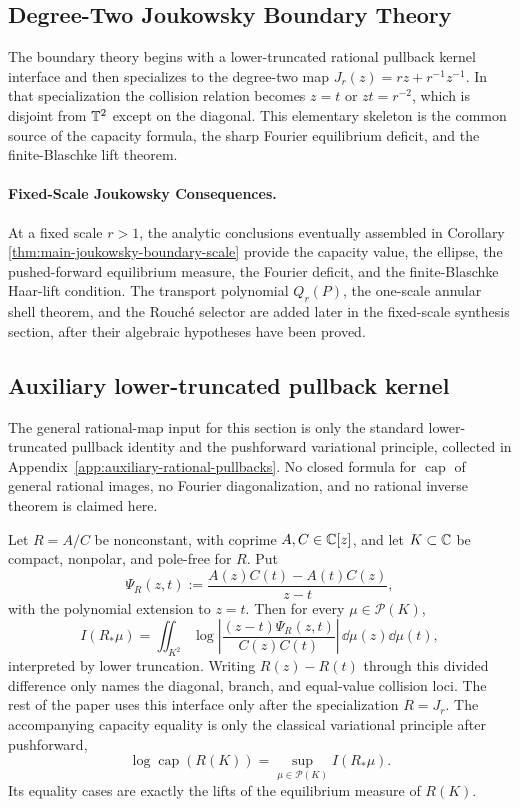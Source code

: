 \subsection{Degree-Two Joukowsky Boundary Theory}\label{subsec:main-joukowsky-boundary-scale}

The boundary theory begins with a lower-truncated rational pullback
kernel interface and then specializes to the degree-two map
\(J_r(z)=rz+r^{-1}z^{-1}\).  In that specialization the collision
relation becomes \(z=t\) or \(zt=r^{-2}\), which is disjoint from
\(\mathbb{T}^2\) except on the diagonal.  This elementary skeleton is the
common source of the capacity formula, the sharp Fourier equilibrium
deficit, and the finite-Blaschke lift theorem.

\paragraph{Fixed-Scale Joukowsky Consequences.}\label{par:fixed-scale-joukowsky-package-scope}
At a fixed scale \(r>1\), the analytic conclusions eventually assembled
in Corollary \ref{thm:main-joukowsky-boundary-scale} provide the capacity
value, the ellipse, the pushed-forward equilibrium measure, the Fourier
deficit, and the finite-Blaschke Haar-lift condition.  The transport
polynomial \(Q_r(P)\), the one-scale annular shell theorem, and the
Rouch\'e selector are added later in the fixed-scale synthesis section,
after their algebraic hypotheses have been proved.

\subsection{Auxiliary lower-truncated pullback kernel}\label{subsec:degree-two-joukowsky-specialization}

The general rational-map input for this section is only the standard
lower-truncated pullback identity and the pushforward variational
principle, collected in Appendix~\ref{app:auxiliary-rational-pullbacks}.
No closed formula for \(\operatorname{cap}\) of general rational images,
no Fourier diagonalization, and no rational inverse theorem is claimed
here.
\begin{proposition}\label{prop:main-rational-pullback-interface}
Let \(R=A/C\) be nonconstant, with coprime \(A,C\in\mathbb{C}[z]\), and let
\(K\subset\mathbb{C}\) be compact, nonpolar, and pole-free for \(R\).  Put
\[
\Psi_R(z,t):=\frac{A(z)C(t)-A(t)C(z)}{z-t},
\]
with the polynomial extension to \(z=t\).  Then for every
\(\mu\in\mathcal P(K)\),
\[
I(R_\ast\mu)=
\iint_{K^2}\log\left|
\frac{(z-t)\Psi_R(z,t)}{C(z)C(t)}
\right|\,\dd\mu(z)\dd\mu(t),
\]
interpreted by lower truncation.  Writing \(R(z)-R(t)\) through this
divided difference only names the diagonal, branch, and equal-value
collision loci.  The rest of the paper uses this interface only after
the specialization \(R=J_r\).
The accompanying capacity equality is only the classical variational
principle after pushforward,
\[
\log\operatorname{cap}(R(K))
=\sup_{\mu\in\mathcal P(K)}I(R_\ast\mu).
\]
Its equality cases are exactly the lifts of the equilibrium measure of
\(R(K)\).
\end{proposition}

